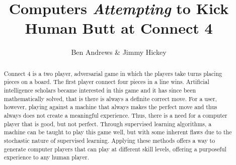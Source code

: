 \documentclass[]{article}
\title{Computers \textit{Attempting} to Kick Human Butt at Connect 4}
\author{Ben Andrews \& Jimmy Hickey}
\begin{document}
	\maketitle
\begin{abstract}
	Connect 4 is a two player, adversarial game in which the players take turns placing pieces on a board. The first player connect four pieces in a line wins. Artificial intelligence scholars became interested in this game and it has since been mathematically solved, that is there is always a definite correct move. For a user, however, playing against a machine that always makes the perfect move and thus always does not create a meaningful experience. Thus, there is a need for a computer player that is good, but not perfect. Through supervised learning algorithms, a machine can be taught to play this game well, but with some inherent flaws due to the stochastic nature of supervised learning. Applying these methods offers a way to generate computer players that can play at different skill levels, offering a purposeful experience to any human player.
\end{abstract}
\end{document}
